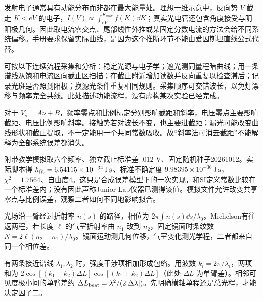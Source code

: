 \begin{center}\end{center}

发射电子通常具有动能分布而非都在最大能量处。理想一维示意中，反向势 $V$ 截走 $K<eV$ 的电子，$I(V)\propto\int_{eV}^{K_{\max}}f(K)\dd K$；真实光电管还包含角度接受与阴阳极几何。因此取电流零交点、尾部线性外推或某固定分数电流的方法会给不同系统偏移。手册要求保留实际曲线，是因为这个推断环节不能由爱因斯坦直线公式代替。

可按以下连续流程采集和分析：稳定光源与电子学；遮光测同量程暗曲线；用一条谱线从饱和电流区向截止区扫描；在截止附近增加读数并反向重复以检查滞后；记录光斑是否照到阳极；换滤光条件重复相同规则。采集顺序可交错波长，以免灯漂移与频率完全共线。此处描述功能流程，没有虚构某次实验已经完成。

对于 $V_s=A\nu+B$，频率零点和比例标定分别影响截距和斜率，电压零点主要影响截距、电压比例影响斜率。接触势若对波长不变，也主要进截距；漏光可能改变曲线形状和截止提取，不一定能用一个共同常数吸收。故“斜率法可消去截距”不能解释为全部系统误差都消失。

附带教学模拟取六个频率、独立截止标准差 $.012$ V、固定随机种子20261012。实际脚本得 $h_{\rm fit}=6.54115\times10^{-34}\,\mathrm{J\,s}$、标准不确定度 $9.98395\times10^{-36}\,\mathrm{J\,s}$，$\chi^2=1.7564$、自由度4。这只是合成误差模型下的一次实现，和SI定义常数比较在一个标准差内；没有因此声称Junior Lab仪器已测得该值。模拟文件允许改变共享零点与比例误差，观察二者如何不同地影响拟合。

光场沿一臂经过折射率 $n(s)$ 的路径，相位为 $2\pi\int n(s)\dd s/\lambda_0$。Michelson有往返两程，若长度 $\ell$ 的气室折射率由 $n_1$ 改到 $n_2$，固定镜面时条纹数 $N=2\ell(n_2-n_1)/\lambda_0$。镜面运动测几何位移，气室变化测光学程，二者都来自同一个相位差。

有两条接近谱线 $\lambda_1,\lambda_2$ 时，强度干涉项相加形成包络。用波数 $k_i=2\pi/\lambda_i$，两项和为 $2\cos[(k_1-k_2)\Delta L]\cos[(k_1+k_2)\Delta L]$（此处 $\Delta L$ 为单臂差）。相邻可见度极小间的单臂差约 $\Delta L_{\rm beat}=\lambda^2/(2|\Delta\lambda|)$。先明确横轴单程还是总光程，才能决定因子二。

